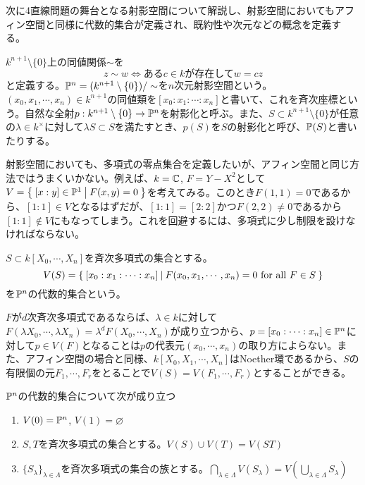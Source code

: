 \documentclass{ltjsreport}
\begin{document}
次に4直線問題の舞台となる射影空間について解説し、射影空間においてもアフィン空間と同様に代数的集合が定義され、既約性や次元などの概念を定義する。

\begin{defin}
  $k^{n+1}\setminus\{0\}$上の同値関係$\sim$を
  \[
  z\sim w\Leftrightarrow \text{ある$c\in k$が存在して}w=cz  
  \]
  と定義する。$\mathbb{P}^n=(k^{n+1}\setminus\{0\})/\sim$を$n$次元射影空間という。$(x_0,x_1,\cdots,x_n)\in k^{n+1}$の同値類を$[x_0:x_1:\cdots:x_n]$と書いて、これを斉次座標という。自然な全射$p:k^{n+1}\setminus\{0\}\rightarrow \mathbb{P}^n$を射影化と呼ぶ。また、$S\subset k^{n+1}\setminus\{0\}$が任意の$\lambda\in k^\times $に対して$\lambda S\subset S$を満たすとき、$p(S)$を$S$の射影化と呼び、$\mathbb{P}(S)$と書いたりする。
\end{defin}

射影空間においても、多項式の零点集合を定義したいが、アフィン空間と同じ方法ではうまくいかない。例えば、$k=\mathbb{C}$, $F=Y-X^2$として$V=\left\{\:[x:y]\in\mathbb{P}^1\:\middle|\:F(x,y)=0\:\right\}$を考えてみる。このとき$F(1,1)=0$であるから、$[1:1]\in V$となるはずだが、$[1:1]=[2:2]$かつ$F(2,2)\neq 0$であるから$[1:1]\notin V$にもなってしまう。これを回避するには、多項式に少し制限を設けなければならない。

\begin{defin}
  $S\subset k[X_0,\cdots,X_n]$を斉次多項式の集合とする。
  \[
  V(S)=\left\{\:[x_0:x_1:\cdots:x_n]\:\middle|\:F(x_0,x_1,\cdots,x_n)=0\text{ for all }F\in S\:\right\}  
  \]
  を$\mathbb{P}^n$の代数的集合という。
\end{defin}

$F$が$d$次斉次多項式であるならば、$\lambda\in k$に対して$F(\lambda X_0,\cdots,\lambda X_n)=\lambda^dF(X_0,\cdots,X_n)$が成り立つから、$p=[x_0:\cdots:x_n]\in \mathbb{P}^n$に対して$p\in V(F)$となることは$p$の代表元$(x_0,\cdots,x_n)$の取り方によらない。また、アフィン空間の場合と同様、$k[X_0,X_1,\cdots,X_n]$はNoether環であるから、$S$の有限個の元$F_1,\cdots,F_r$をとることで$V(S)=V(F_1,\cdots,F_r)$とすることができる。

\begin{prop}\label{zariski_for_proj}
  $\mathbb{P}^n$の代数的集合について次が成り立つ
  \begin{enumerate}
    \item $V(0)=\mathbb{P}^n$, $V(1)=\varnothing$
    \item $S,T$を斉次多項式の集合とする。$V(S)\cup V(T)=V(ST)$
    \item $\{S_\lambda\}_{\lambda\in\Lambda}$を斉次多項式の集合の族とする。$\bigcap_{\lambda\in\Lambda}V(S_\lambda)=V(\bigcup_{\lambda\in\Lambda}S_\lambda)$
  \end{enumerate}
\end{prop}
\end{document}
